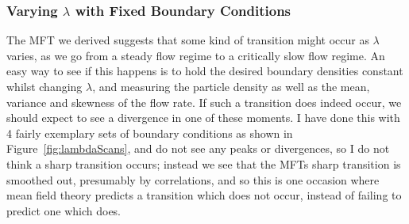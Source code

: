 \subsubsection{Varying $\lambda$ with Fixed Boundary Conditions}
The MFT we derived suggests that some kind of transition might occur as $\lambda$ varies, as we go from a steady flow regime to a critically slow flow regime. An easy way to see if this happens is to hold the desired boundary densities constant
whilst changing $\lambda$, and measuring the particle density as well as the mean, variance and skewness of the flow rate. If such a transition does indeed occur, we should expect to see a divergence in one of these moments. I have done this with
4 fairly exemplary sets of boundary conditions as shown in Figure~\ref{fig:lambdaScans}, and do not see any peaks or divergences, so I do not think a sharp transition occurs; instead we see that the MFTs sharp transition is smoothed out, presumably by correlations, and so this is one
occasion where mean field theory predicts a transition which does not occur, instead of failing to predict one which does.
